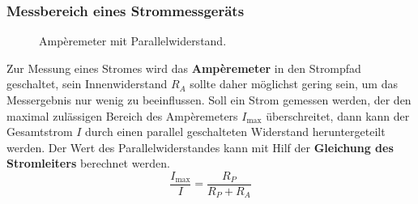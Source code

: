 \subsubsection{Messbereich eines Strommessgeräts}
\begin{figure}[H]
\centering
\caption{Ampèremeter mit Parallelwiderstand.}
\label{fig_IIIs}
\end{figure}
\noindent Zur Messung eines Stromes wird das \textbf{Ampèremeter} in den Strompfad geschaltet, sein Innenwiderstand  $R_A$ sollte daher möglichst gering sein, um das Messergebnis nur wenig zu beeinflussen. Soll ein Strom gemessen werden, der den maximal zulässigen Bereich des Ampèremeters $I_{\text{max}}$ überschreitet, dann kann der Gesamtstrom $I$ durch einen parallel geschalteten Widerstand heruntergeteilt werden. Der Wert des Parallelwiderstandes kann mit Hilf der \textbf{Gleichung des Stromleiters} berechnet werden.
\begin{equation}
\boxed{\dfrac{I_{\text{max}}}{I}=\dfrac{R_P}{R_P+R_A}}
\end{equation}
